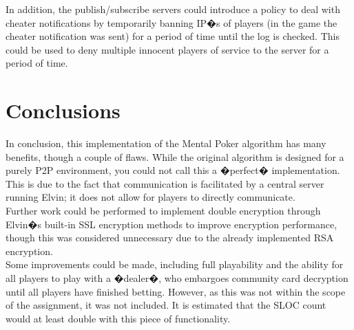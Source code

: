 \documentclass[11pt, oneside]{article}   	%
\begin{document}
In addition, the publish/subscribe servers could introduce a policy to deal with cheater notifications by temporarily banning IP�s of players (in the game the cheater notification was sent) for a period of time until the log is checked. This could be used to deny multiple innocent players of service to the server for a period of time.\\

\section{Conclusions}

In conclusion, this implementation of the Mental Poker algorithm has many benefits, though a couple of flaws. While the original algorithm is designed for a purely P2P environment, you could not call this a �perfect� implementation. This is due to the fact that communication is facilitated by a central server running Elvin; it does not allow for players to directly communicate.\\

Further work could be performed to implement double encryption through Elvin�s built-in SSL encryption methods to improve encryption performance, though this was considered unnecessary due to the already implemented RSA encryption.\\

Some improvements could be made, including full playability and the ability for all players to play with a �dealer�, who embargoes community card decryption until all players have finished betting. However, as this was not within the scope of the assignment, it was not included. It is estimated that the SLOC count would at least double with this piece of functionality.\\




\end{document}
